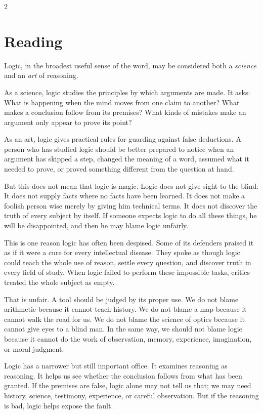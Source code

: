 \documentclass[12pt]{article}
\begin{document}
\begin{multicols}{2}
\section*{Reading}
Logic, in the broadest useful sense of the word, may be considered both a \textit{science} and an \textit{art} of reasoning.

As a science, logic studies the principles by which arguments are made. It asks: What is happening when the mind moves from one claim to another? What makes a conclusion follow from its premises? What kinds of mistakes make an argument only appear to prove its point?

As an art, logic gives practical rules for guarding against false deductions. A person who has studied logic should be better prepared to notice when an argument has skipped a step, changed the meaning of a word, assumed what it needed to prove, or proved something different from the question at hand.

But this does not mean that logic is magic. Logic does not give sight to the blind. It does not supply facts where no facts have been learned. It does not make a foolish person wise merely by giving him technical terms. It does not discover the truth of every subject by itself. If someone expects logic to do all these things, he will be disappointed, and then he may blame logic unfairly.

This is one reason logic has often been despised. Some of its defenders praised it as if it were a cure for every intellectual disease. They spoke as though logic could teach the whole use of reason, settle every question, and discover truth in every field of study. When logic failed to perform these impossible tasks, critics treated the whole subject as empty.

That is unfair. A tool should be judged by its proper use. We do not blame arithmetic because it cannot teach history. We do not blame a map because it cannot walk the road for us. We do not blame the science of optics because it cannot give eyes to a blind man. In the same way, we should not blame logic because it cannot do the work of observation, memory, experience, imagination, or moral judgment.

Logic has a narrower but still important office. It examines reasoning as reasoning. It helps us see whether the conclusion follows from what has been granted. If the premises are false, logic alone may not tell us that; we may need history, science, testimony, experience, or careful observation. But if the reasoning is bad, logic helps expose the fault.


\end{multicols}
\end{document}

